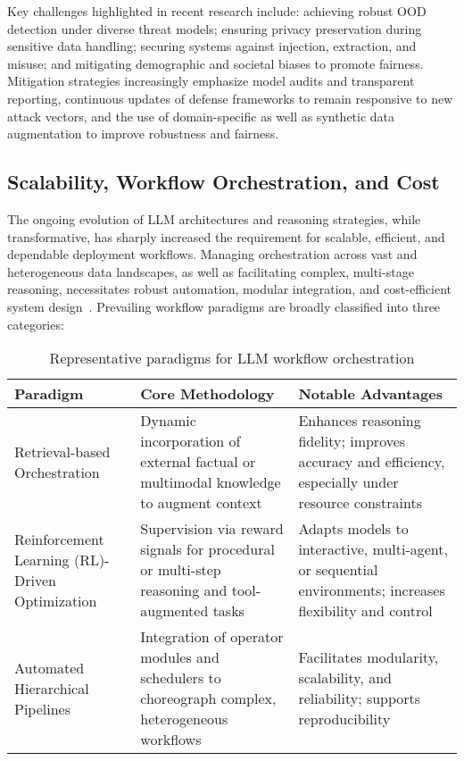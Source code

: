 \documentclass[sigconf]{acmart}
\begin{document}
Key challenges highlighted in recent research include: achieving robust OOD detection under diverse threat models; ensuring privacy preservation during sensitive data handling; securing systems against injection, extraction, and misuse; and mitigating demographic and societal biases to promote fairness. Mitigation strategies increasingly emphasize model audits and transparent reporting, continuous updates of defense frameworks to remain responsive to new attack vectors, and the use of domain-specific as well as synthetic data augmentation to improve robustness and fairness.

\subsection{Scalability, Workflow Orchestration, and Cost}

The ongoing evolution of LLM architectures and reasoning strategies, while transformative, has sharply increased the requirement for scalable, efficient, and dependable deployment workflows. Managing orchestration across vast and heterogeneous data landscapes, as well as facilitating complex, multi-stage reasoning, necessitates robust automation, modular integration, and cost-efficient system design~\cite{ref5,ref8,ref9,ref12,ref37,ref43,ref50,ref55,ref57,ref60,ref64,ref79,ref80,ref86,ref88,ref89,ref104}. Prevailing workflow paradigms are broadly classified into three categories:

\begin{table*}[htbp]
\centering
\caption{Representative paradigms for LLM workflow orchestration}
\label{tab:workflow_paradigms}
\begin{adjustbox}{max width=\textwidth}
\begin{tabular}{lll}
\toprule
\textbf{Paradigm} & \textbf{Core Methodology} & \textbf{Notable Advantages} \\
\midrule
Retrieval-based Orchestration & Dynamic incorporation of external factual or multimodal knowledge to augment context & Enhances reasoning fidelity; improves accuracy and efficiency, especially under resource constraints~\cite{ref5,ref50,ref79,ref80} \\
Reinforcement Learning (RL)-Driven Optimization & Supervision via reward signals for procedural or multi-step reasoning and tool-augmented tasks & Adapts models to interactive, multi-agent, or sequential environments; increases flexibility and control~\cite{ref8,ref9,ref12,ref37,ref55,ref60,ref64,ref86} \\
Automated Hierarchical Pipelines & Integration of operator modules and schedulers to choreograph complex, heterogeneous workflows & Facilitates modularity, scalability, and reliability; supports reproducibility~\cite{ref12,ref64,ref86,ref79} \\
\bottomrule
\end{tabular}
\end{adjustbox}
\end{table*}
\end{document}
